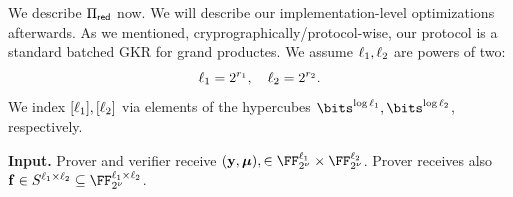 \documentclass[11pt,letterpaper,usenames,dvipsnames]{article}
\begin{document}
We  describe $\Pi_{\mathsf{red}}$ now. We will describe our implementation-level optimizations afterwards. As we mentioned, cryprographically/protocol-wise, our protocol is a standard batched GKR for grand productes.  We assume $\ell_1,\ell_2$ are powers of two:
%
$$
\ell_1 = 2^{r_1}, \quad \ell_2 = 2^{r_2}.
$$
We index $[\ell_1],[\ell_2]$ via elements of the hypercubes $\bits^{\log \codedim_1}, \bits^{\log \codedim_2}$, respectively.
%
\begin{construction}\label{c:gkr_grand_product}
\noindent \textbf{Input.}   Prover and verifier receive $(\yy,\bm{\mu}),  \in \comfield^{\codedim_1} \times  \comfield^{\codedim_2}$. Prover receives also $\bff\in S^{\codedim_1\times \codedim_2}\subseteq\comfield^{\codedim_1\times \codedim_2}$.



\end{construction}
\end{document}
